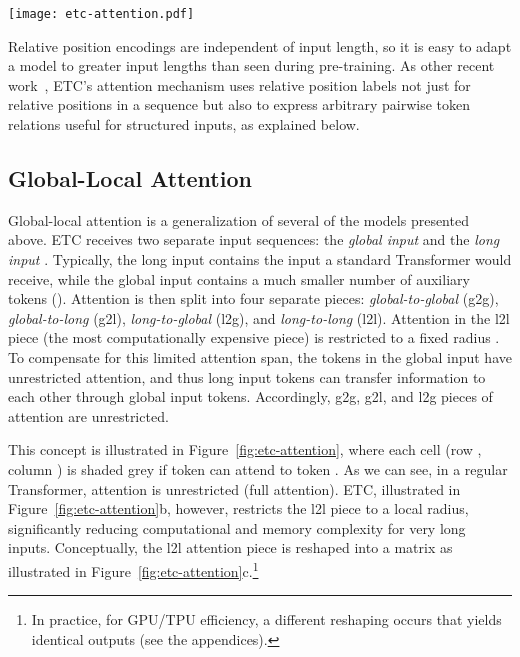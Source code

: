 \documentclass[11pt,a4paper]{article}
\begin{document}
\begin{figure*}[t!]
	\texttt{[image: etc-attention.pdf]}
	\centering
	\caption{Sparsity diagram showing which attention queries (rows) can attend to which attention keys (columns) a) for standard Transformer attention with input size ; b) for global-local attention with input sizes , , and radius ; c) how the l2l attention piece is reshaped into a much smaller attention matrix, limited by local radius.}
	\label{fig:etc-attention}
\end{figure*}

Relative position encodings are independent of input length, so it is easy to adapt a model to greater input lengths than seen during pre-training. As other recent work~\cite{shaw2019generating},  ETC's attention mechanism uses relative position labels not just for relative positions in a sequence but also to express arbitrary pairwise token relations useful for structured inputs, as explained below.

\subsection{Global-Local Attention}



Global-local attention is a generalization of several of the models presented above. ETC receives two separate input sequences: the {\em global input}  and the {\em long input} . Typically, the long input contains the input a standard Transformer would receive, while the global input contains a much smaller number of auxiliary tokens (). Attention is then split into four separate pieces: {\em global-to-global} (g2g),  {\em global-to-long} (g2l),  {\em long-to-global} (l2g), and  {\em long-to-long} (l2l). 
Attention in the l2l piece (the most computationally expensive piece) is restricted to a fixed radius . To compensate for this limited attention span, the tokens in the global input have unrestricted attention, and thus long input tokens can transfer information to each other through global input tokens. Accordingly, g2g, g2l, and l2g pieces of attention are unrestricted. 

This concept is illustrated in Figure~\ref{fig:etc-attention}, where each cell (row , column ) is shaded grey if token  can attend to token . As we can see, in a regular Transformer, attention is unrestricted (full  attention). ETC, illustrated in Figure~\ref{fig:etc-attention}b, however, restricts the l2l piece to a local radius, significantly reducing computational and memory complexity for very long inputs. Conceptually, the l2l attention piece is reshaped into a  matrix as illustrated in Figure~\ref{fig:etc-attention}c.\footnote{In practice, for GPU/TPU efficiency, a different reshaping occurs that yields identical outputs (see the appendices).}
\end{document}
